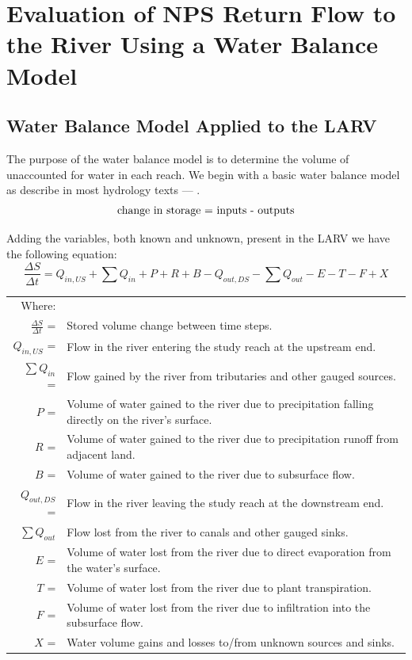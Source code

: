 \chapter{Evaluation of NPS Return Flow to the River Using a Water Balance Model}
\label{chap:WaterBalanceModel}

\section{Water Balance Model Applied to the LARV}
\label{sec:AppliedWaterModel}

The purpose of the water balance model is to determine the volume of unaccounted for water in each reach.  We begin with a basic water balance model as describe in most hydrology texts --- \parencite{wanielista1997}.
\begin{equation}
	\textnormal{change in storage = inputs - outputs} \nonumber
\end{equation}

Adding the variables, both known and unknown, present in the LARV we have the following equation:
\begin{equation}
\label{eq:water1}
	\frac{\Delta S}{\Delta t} = Q_{in,US} + \sum Q_{in} + P + R + B - Q_{out,DS} - \sum Q_{out} - E - T - F + X
\end{equation}
\begin{longtable}{r p{5.5in}}
	Where: \\
	$\displaystyle \frac{\Delta S}{\Delta t}$ =&Stored volume change between time steps.\\
	$ Q_{in,US} $ = & Flow in the river entering the study reach at the upstream end.\\
	$ \displaystyle \sum Q_{in} $ = & Flow gained by the river from tributaries and other gauged sources.\\
	$ P $ = & Volume of water gained to the river due to precipitation falling directly on the river's surface.\\
	$ R $ = & Volume of water gained to the river due to precipitation runoff from adjacent land. \\
	$ B $ = & Volume of water gained to the river due to subsurface flow. \\
	$ Q_{out,DS} $ = & Flow in the river leaving the study reach at the downstream end.\\
	$ \displaystyle \sum Q_{out} $ & Flow lost from the river to canals and other gauged sinks.\\
	$ E $ = & Volume of water lost from the river due to direct evaporation from the water's surface.\\
	$ T $ = & Volume of water lost from the river due to plant transpiration.\\
	$ F $ = & Volume of water lost from the river due to infiltration into the subsurface flow.\\
	$ X $ = & Water volume gains and losses to/from unknown sources and sinks.\\
\end{longtable}

